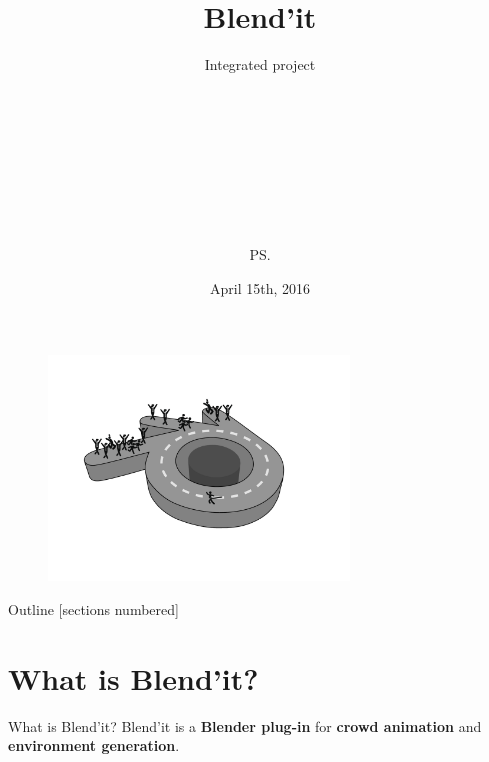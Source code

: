 \documentclass{beamer}
\title{Blend'it}
\subtitle{Integrated project}
\author{\bb\\ \gc\\ \dl\\ \vl\\ \om\\ \mr\\ \me\\ \js\\ \ps\\}
\date{April 15th, 2016}
\begin{document}
\begin{frame}
\begin{figure}
  \begin{center}
    \includegraphics[width=8cm]{logo.pdf}
  \end{center}
\end{figure}
\end{frame}

\maketitle

\bgroup
{}
\begin{frame}[plain]{}
\end{frame}
\egroup

\begin{frame}{Outline}
  [sections numbered]
  \tableofcontents[hideallsubsections]
\end{frame}

\section{What is Blend'it?}
\begin{frame}{What is Blend'it?}
  Blend'it is a \textbf{Blender plug-in} for \textbf<1>{crowd animation} and \textbf<2>{environment generation}.
  
  \begin{figure}%
\centering
{} ~ 
 ~ 
\\
\label{3figs}

\end{figure}
\end{frame}
\end{document}
